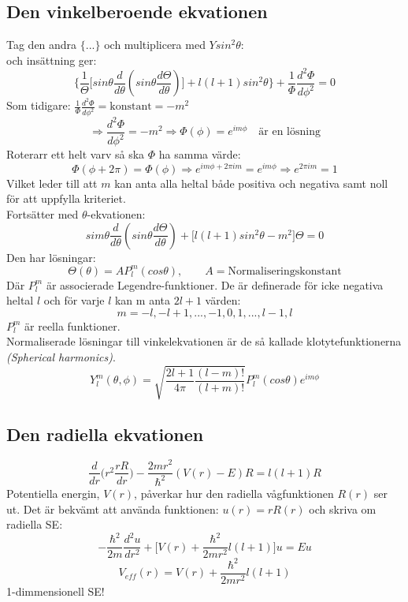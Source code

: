 \documentclass{article}
\begin{document}
  \subsection{Den vinkelberoende ekvationen}
    Tag den andra $\{...\}$ och multiplicera med $Ysin^2\theta$:\\

     och insättning ger:
     \[
      \bigg\{\frac{1}{\Theta}\big[sin\theta\frac{d}{d\theta}(sin\theta\frac{d\Theta}{d\theta})\big]+l(l+1)sin^2\theta\bigg\}+ \frac{1}{\Phi}\frac{d^2\Phi}{d\phi^2}=0
     \]
     Som tidigare: $\frac{1}{\Phi}\frac{d^2\Phi}{d\phi^2}=\text{konstant}=-m^2$
     \[
      \Rightarrow \frac{d^2\Phi}{d\phi^2}=-m^2 \Rightarrow \Phi(\phi)=e^{im\phi}\quad\text{är en lösning}
     \]
     Roterarr ett helt varv så ska $\Phi$ ha samma värde:
     \[
      \Phi(\phi+2\pi)=\Phi(\phi)\Rightarrow e^{im\phi+2\pi im}=e^{im\phi}\Rightarrow e^{2\pi im}=1
     \]
     Vilket leder till att $m$ kan anta alla heltal både positiva och negativa samt noll för att uppfylla kriteriet.\\

     Fortsätter med $\theta$-ekvationen:\\
     \[
      sim\theta\frac{d}{d\theta}(sin\theta\frac{d\Theta}{d\theta})+\big[l(l+1)sin^2\theta-m^2\big]\Theta=0
     \]
     Den har lösningar:
     \[
      \Theta(\theta)=AP_l^m(cos\theta),\qquad A=\text{Normaliseringskonstant}
     \]
     Där $P_l^m$ är associerade Legendre-funktioner. De är definerade för icke negativa heltal $l$ och för varje $l$ kan m anta $2l+1$ värden:
     \[
      m=-l,-l+1,...,-1,0,1,...,l-1,l
     \]
     $P_l^m$ är reella funktioner.\\

     Normaliserade lösningar till vinkelekvationen är de så kallade klotytefunktionerna \textit{(Spherical harmonics)}.
     \[
      Y_l^m(\theta,\phi)=\sqrt{\frac{2l+1}{4\pi}\frac{(l-m)!}{(l+m)!}}P_l^m(cos\theta)e^{im\phi}
     \]
  \subsection{Den radiella ekvationen}
    \[
      \frac{d}{dr}\big(r^2\frac{rR}{dr}\big)-\frac{2mr^2}{\hbar^2}(V(r)-E)R=l(l+1)R
    \]
    Potentiella energin, $V(r)$, påverkar hur den radiella vågfunktionen $R(r)$ ser ut. Det är bekvämt att använda funktionen: $u(r)=rR(r)$ och skriva om radiella SE:
    \[
      -\frac{\hbar^2}{2m}\frac{d^2u}{dr^2}+\big[V(r)+\frac{\hbar^2}{2mr^2}l(l+1)\big]u=Eu
    \]
    \[
      V_{eff}(r)=V(r)+\frac{\hbar^2}{2mr^2}l(l+1)
    \]
    1-dimmensionell SE!\\
\end{document}
